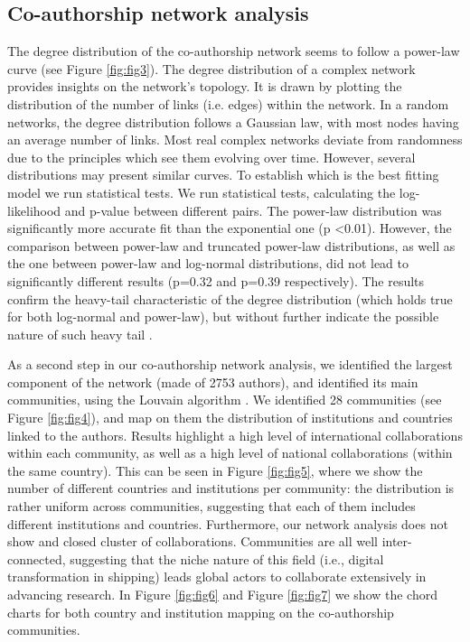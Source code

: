 \documentclass[jmse,review,submit,pdftex,moreauthors]{Definitions/mdpi}
\begin{document}
\subsection{Co-authorship network analysis}
The degree distribution of the co-authorship network seems to follow a power-law curve (see Figure \ref{fig:fig3}). The degree distribution of a complex network provides insights on the network's topology. It is drawn by plotting the distribution of the number of links (i.e. edges) within the network. In a random networks, the degree distribution follows a Gaussian law, with most nodes having an average number of links. Most real complex networks deviate from randomness due to the principles which see them evolving over time. However, several distributions may present similar curves. To establish which is the best fitting model we run statistical tests. We run statistical tests, calculating the log-likelihood and p-value between different pairs. The power-law distribution was significantly more accurate fit than the exponential one (p \textless 0.01). However, the comparison between power-law and truncated power-law distributions, as well as the one between power-law and log-normal distributions, did not lead to significantly different results (p=0.32 and p=0.39 respectively). The results confirm the heavy-tail characteristic of the degree distribution (which holds true for both log-normal and power-law), but without further indicate the possible nature of such heavy tail \citep{mitzenmacher2004brief,higaki2020co,liu2021structural,smith2021explaining}.

As a second step in our co-authorship network analysis, we identified the largest component of the network (made of 2753 authors), and identified its main communities, using the Louvain algorithm \citep{blondel2008fast}. We identified 28 communities (see Figure \ref{fig:fig4}), and map on them the distribution of institutions and countries linked to the authors. Results highlight a high level of international collaborations within each community, as well as a high level of national collaborations (within the same country). This can be seen in Figure \ref{fig:fig5}, where we show the number of different countries and institutions per community: the distribution is rather uniform across communities, suggesting that each of them includes different institutions and countries. Furthermore, our network analysis does not show and closed cluster of collaborations. Communities are all well inter-connected, suggesting that the niche nature of this field (i.e., digital transformation in shipping) leads global actors to collaborate extensively in advancing research. In Figure \ref{fig:fig6} and Figure \ref{fig:fig7} we show the chord charts for both country and institution mapping on the co-authorship communities.
\end{document}
